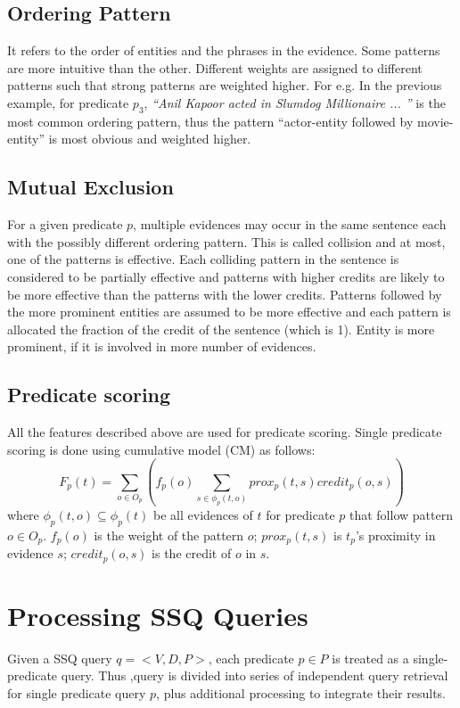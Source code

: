 \documentclass[11pt]{report}
\begin{document}
\subsection{Ordering Pattern}
It refers to the order of entities and the phrases in the evidence. Some patterns are more intuitive than the other. Different
weights are assigned to different patterns such that strong patterns are weighted higher. For e.g. In the previous example,
for predicate $p_{3}$, \textit{``Anil Kapoor acted in Slumdog Millionaire ... ''} is the most common ordering pattern,
thus the pattern ``actor-entity followed by movie-entity'' is most obvious and weighted higher.
\subsection{Mutual Exclusion}
For a given predicate $p$, multiple evidences may occur in the same sentence each with the possibly different
ordering pattern. This is called collision and at most, one of the patterns is effective. Each colliding pattern in the
sentence is considered to be partially effective and patterns with higher credits are likely to be more effective than the
patterns with the lower credits. Patterns followed by the more prominent entities are assumed to be more effective and each
pattern is allocated the fraction of the credit of the sentence (which is 1). Entity is more prominent, if it is 
involved in more number of evidences.
\subsection{Predicate scoring} 
All the features described above are used for predicate scoring.  Single predicate scoring is done using cumulative
model (CM) as follows:
\begin{equation}
 F_{p}(t)= \sum_{o \in O_{p}}(f_{p}(o) \sum_{s \in \phi_{p}(t,o)} prox_{p}(t,s) credit_{p}(o,s))
\end{equation}
where $\phi_{p}(t,o) \subseteq \phi_{p}(t)$ be all evidences of $t$ for predicate $p$ that follow pattern $o \in O_{p}$.
$f_{p}(o)$ is the weight of the pattern $o$; $prox_{p}(t,s)$ is $t_{p}$'s proximity in evidence $s$; 
$credit_{p}(o,s)$ is the credit of $o$ in $s$.

\section{Processing SSQ Queries}

Given a SSQ query $q=<V,D,P>$, each predicate $p \in P$ is treated as a single-predicate query. Thus ,query is divided 
into series of independent query retrieval for single predicate query $p$, plus additional processing to integrate
their results.
\end{document}
